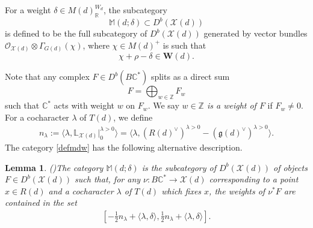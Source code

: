 \documentclass [11pt,oneside,a4paper,mathscr]{amsart}
\newtheorem{lemma}[thm]{Lemma}
\theoremstyle{definition}
\renewcommand{\leq}{\leqslant}
\newcommand{\X}{\mathscr{X}}
\begin{document}
For a weight $\delta\in M(d)_{\mathbb{R}}^{W_d}$,
the subcategory \begin{equation}\label{defmdw}
    \mathbb{M}(d; \delta)\subset D^b(\X(d))
\end{equation}
is defined to be the full subcategory of $D^b(\X(d))$ generated by vector bundles $\mathcal{O}_{\X(d)}\otimes\Gamma_{G(d)}(\chi)$, where $\chi \in M(d)^+$ is
such that
\[\chi+\rho-\delta\in \mathbf{W}(d).\] 
    
    Note that any complex $F\in D^b(B\mathbb{C}^*)$ splits as a direct sum \[F=\bigoplus_{w\in\mathbb{Z}}F_w\] such that $\mathbb{C}^*$ acts with weight $w$ on $F_w$. We say \textit{$w\in \mathbb{Z}$ is a weight of $F$} if $F_w\neq 0$.
For a cocharacter $\lambda$ of $T(d)$, we 
define 
   \begin{align}\label{nlambdadef}
n_{\lambda} :=\langle \lambda, \mathbb{L}_{\X(d)}|_{0}^{\lambda>0} \rangle 
=\langle \lambda, (R(d)^{\vee})^{\lambda>0}-
(\mathfrak{g}(d)^{\vee})^{\lambda>0}\rangle. 
\end{align}
 The category \eqref{defmdw} has the following alternative description. 
\begin{lemma}\emph{(\cite[Corollary 3.11]{PTquiver})}\label{lemma:alt}
    The category $\mathbb{M}(d; \delta)$ is the subcategory of $D^b(\X(d))$ of objects $F\in D^b(\X(d))$ such that, for any $\nu \colon B\mathbb{C}^*\to \X(d)$
    corresponding to a point $x \in R(d)$ and a cocharacter 
    $\lambda$ of $T(d)$ which fixes $x$, the weights of $\nu^*F$ are contained in the set 
    \begin{align*}\left[-\frac{1}{2}n_{\lambda}+\langle \lambda, \delta\rangle, \frac{1}{2}n_{\lambda}+\langle \lambda, \delta\rangle\right].
    \end{align*}  
\end{lemma}
\end{document}
